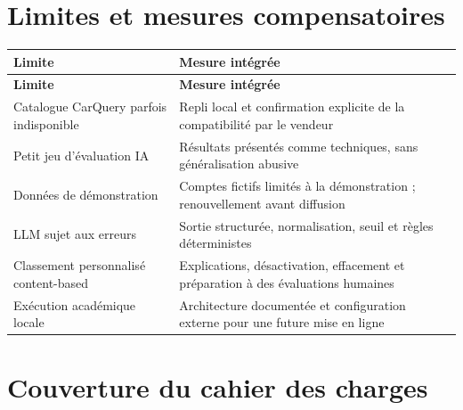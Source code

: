 \section{Limites et mesures compensatoires}

{\small\singlespacing{}
\begin{longtable}{|>{\raggedright\arraybackslash}p{}|>{\raggedright\arraybackslash}p{}|}
\hline
\rowcolor{tablehead} \color{white}\bfseries Limite & \color{white}\bfseries Mesure intégrée \\ \hline
\endfirsthead
\rowcolor{tablehead} \color{white}\bfseries Limite & \color{white}\bfseries Mesure intégrée \\ \hline
\endhead
\hline\endfoot
Catalogue CarQuery parfois indisponible & Repli local et confirmation explicite de la compatibilité par le vendeur \\ \hline
\rowcolor{tablerow} Petit jeu d'évaluation IA & Résultats présentés comme techniques, sans généralisation abusive \\ \hline
Données de démonstration & Comptes fictifs limités à la démonstration ; renouvellement avant diffusion \\ \hline
\rowcolor{tablerow} LLM sujet aux erreurs & Sortie structurée, normalisation, seuil et règles déterministes \\ \hline
Classement personnalisé content-based & Explications, désactivation, effacement et préparation à des évaluations humaines \\ \hline
\rowcolor{tablerow} Exécution académique locale & Architecture documentée et configuration externe pour une future mise en ligne \\ \hline
\end{longtable}
}


\section{Couverture du cahier des charges}

